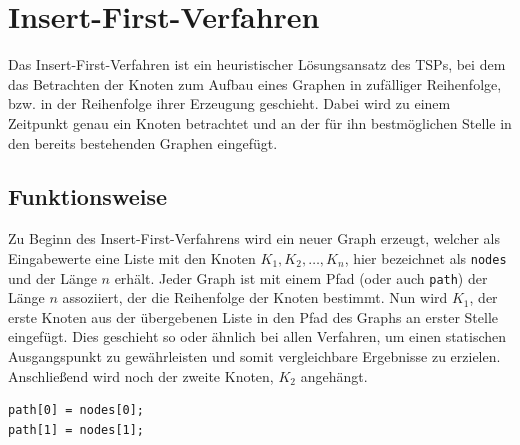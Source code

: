 \section{Insert-First-Verfahren}

Das Insert-First-Verfahren ist ein heuristischer Lösungsansatz des \ac{TSP}s, bei dem das Betrachten der Knoten zum Aufbau eines Graphen in zufälliger Reihenfolge, bzw. in der Reihenfolge ihrer Erzeugung geschieht.
Dabei wird zu einem Zeitpunkt genau ein Knoten betrachtet und an der für ihn bestmöglichen Stelle in den bereits bestehenden Graphen eingefügt.

\subsection{Funktionsweise}
Zu Beginn des Insert-First-Verfahrens wird ein neuer Graph erzeugt, welcher als Eingabewerte eine Liste mit den Knoten $K_1, K_2,  \ldots ,K_n$, hier bezeichnet als \lstinline{nodes} und der Länge $n$ erhält. 
Jeder Graph ist mit einem Pfad (oder auch \lstinline{path}) der Länge $n$ assoziiert, der die Reihenfolge der Knoten bestimmt. 
Nun wird $K_1$, der erste Knoten aus der übergebenen Liste in den Pfad des Graphs an erster Stelle eingefügt. 
Dies geschieht so oder ähnlich bei allen Verfahren, um einen statischen Ausgangspunkt zu gewährleisten und somit vergleichbare Ergebnisse zu erzielen.
Anschließend wird noch der zweite Knoten, $K_2$ angehängt.

\begin{lstlisting}[caption={Zuweisung des ersten und zweiten Knotens}]
path[0] = nodes[0];
path[1] = nodes[1];  
\end{lstlisting}

